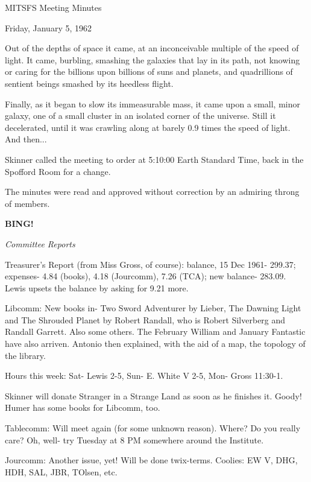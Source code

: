 \documentclass[12pt]{article}
\newcommand{\bing}{{\bf BING!} }
\newcommand{\goto}[1]{\bing \vskip 12pt \centerline{{\em{#1}}}}
\begin{document}
\begin{center}

MITSFS Meeting Minutes

Friday, January 5, 1962

\end{center}
 
\vspace{12pt}

\setlength{\parskip}{6pt}

\noindent
Out of the depths of space it came, at an inconceivable multiple of the speed of light. It came, burbling, smashing the galaxies that lay in its path, not knowing or caring for the billions upon billions of suns and planets, and quadrillions of sentient beings smashed by its heedless flight.

Finally, as it began to slow its immeasurable mass, it came upon a small, minor galaxy, one of a small cluster in an isolated corner of the universe. Still it decelerated, until it was crawling along at barely 0.9 times the speed of light. And then...

Skinner called the meeting to order at 5:10:00 Earth Standard Time, back in the Spofford Room for a change.

The minutes were read and approved without correction by an admiring throng of members.

\goto{Committee Reports}

Treasurer's Report (from Miss Gross, of course): balance, 15 Dec 1961- 299.37; expenses- 4.84 (books), 4.18 (Jourcomm), 7.26 (TCA); new balance- 283.09. Lewis upsets the balance by asking for 9.21 more.

Libcomm: New books in- Two Sword Adventurer by Lieber, The Dawning Light and The Shrouded Planet by Robert Randall, who is Robert Silverberg and Randall Garrett. Also some others. The February William and January Fantastic have also arriven. Antonio then explained, with the aid of a map, the topology of the library.

Hours this week: Sat- Lewis 2-5, Sun- E. White V 2-5, Mon- Gross 11:30-1.

Skinner will donate Stranger in a Strange Land as soon as he finishes it. Goody! Humer has some books for Libcomm, too.

Tablecomm: Will meet again (for some unknown reason). Where? Do you really care? Oh, well- try Tuesday at 8 PM somewhere around the Institute.

Jourcomm: Another issue, yet! Will be done twix-terms. Coolies: EW V, DHG, HDH, SAL, JBR, TOlsen, etc.
\end{document}
